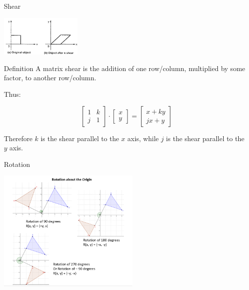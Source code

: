 \documentclass{beamer}
\begin{document}
\begin{frame}{Shear}

  \begin{center}
    \includegraphics[height=2cm]{shear_x}
  \end{center} \pause

  \begin{block}{Definition}
    A matrix shear is the addition of one row/column, multiplied by some factor, to another row/column.
  \end{block} \pause

  {\Large Thus:} \pause

  \[
    \begin{bmatrix}
      1 & k \\
      j & 1
    \end{bmatrix}
    \cdot
    \begin{bmatrix}
      x \\ y
    \end{bmatrix}
    =
    \begin{bmatrix}
      x + ky \\ jx + y
    \end{bmatrix}
  \] \pause

  Therefore $k$ is the shear parallel to the $x$ axis, while $j$ is the shear parallel to the $y$ axis. 

\end{frame}

\begin{frame}{Rotation}
  
  \begin{center}
    \includegraphics[height=6cm]{rotation}
  \end{center}
  
\end{frame}
\end{document}

